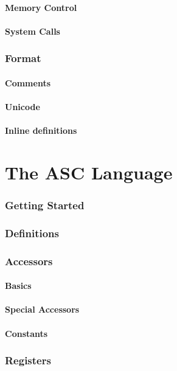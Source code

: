 \documentclass{scrartcl}
\begin{document}
        \subsection{Memory Control}
        \subsection{System Calls}
    \section{Format}
        \subsection{Comments}
        \subsection{Unicode}
        \subsection{Inline definitions}
\part{The ASC Language}
    \section{Getting Started}
    \section{Definitions}
    \section{Accessors}
        \subsection{Basics}
        \subsection{Special Accessors}
        \subsection{Constants}
    \section{Registers}
\end{document}
